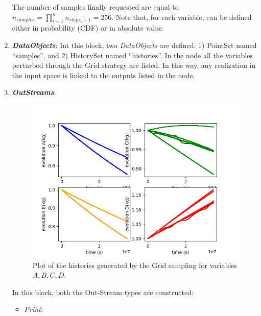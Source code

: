 \begin{enumerate}
  The number of samples finally requested are equal to $n_{samples} = \prod_{i=1}^{n} n_{steps_{i}+1} = 256$.
  Note that, for each variable, can be defined either in probability (CDF) or in absolute value.
   \item \textbf{\textit{DataObjects}}:
  Int this block, two \textit{DataObjects} are defined: 1) PointSet named
  ``samples'', and 2) HistorySet named ``histories''.
  In the  node all the variables
  perturbed through the Grid strategy are listed. In this way, any
  realization in the input space is linked to the outputs listed in  the
   node.
   \item \textbf{\textit{OutStreams}}:
 \begin{figure}[h!]
  \centering
  \includegraphics[scale=0.7]{../../tests/framework/user_guide/ForwardSamplingStrategies/gold/RunDir/Grid/1-historyPlot_line-line-line-line.png}
  \caption{Plot of the histories generated by the Grid sampling for variables $A,B,C,D$.}
  \label{fig:historiesGridPlotLine}
 \end{figure}
  In this block, both the Out-Stream types are constructed:
  \begin{itemize}
    \item \textit{Print}:
     \begin{itemize}

\end{itemize}
\end{itemize}
\end{enumerate}
